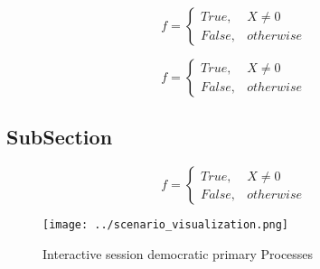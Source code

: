 \documentclass[a4paper]{article}
\begin{document}
\begin{equation}   f =
\begin{cases} True, & X \neq 0\\
False, & otherwise
\end{cases}
\end{equation}

\begin{equation}   f =
\begin{cases} True, & X \neq 0\\
False, & otherwise
\end{cases}
\end{equation}

\subsection{SubSection}

\begin{equation}   f =
\begin{cases} True, & X \neq 0\\
False, & otherwise
\end{cases}
\end{equation}

\begin{figure}
\centering
\texttt{[image: ../scenario\_visualization.png]}
\caption{Interactive session democratic primary Processes 
}
\end{figure}
 
\end{document}
